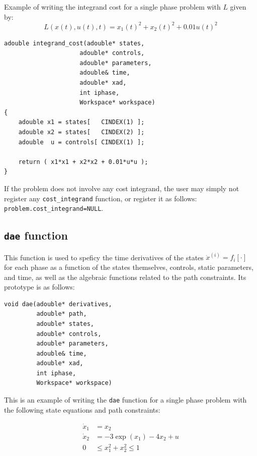 \documentclass[a4paper,11pt]{report}    %
\newenvironment{shadedframe}{%
  \def\FrameCommand{\fcolorbox{black}{shadecolor}}%
  \MakeFramed {\FrameRestore}}
{\endMakeFramed}
\begin{document}
\begin{shadedframe}
  Example of writing the integrand cost for a single phase problem with  $L$ given by:
   \begin{equation}
        L(x(t),u(t),t) = x_1(t)^2 + x_2(t)^2+0.01u(t)^2
   \end{equation}

\begin{verbatim}
adouble integrand_cost(adouble* states, 
                     adouble* controls, 
                     adouble* parameters, 
                     adouble& time, 
                     adouble* xad, 
                     int iphase,
                     Workspace* workspace)
{
    adouble x1 = states[   CINDEX(1) ];
    adouble x2 = states[   CINDEX(2) ];
    adouble  u = controls[ CINDEX(1) ];

    return ( x1*x1 + x2*x2 + 0.01*u*u );
}
\end{verbatim}


\end{shadedframe}

If the problem does not involve any cost integrand, the user may simply not register any \verb|cost_integrand| function,
or register it as follows:  \verb|problem.cost_integrand=NULL|.


\subsection{\texttt{dae} function}

This function is used to speficy the time derivatives of the states $\dot x^{(i)}=f_i[\cdot]$ for each phase as a function 
of the states themselves, controls, static parameters, and time, as well as the algebraic functions related
to the path constraints. Its prototype is as follows:

\begin{verbatim}
void dae(adouble* derivatives, 
         adouble* path, 
         adouble* states, 
         adouble* controls, 
         adouble* parameters, 
         adouble& time, 
         adouble* xad, 
         int iphase,
         Workspace* workspace)
\end{verbatim}

\begin{shadedframe}
  This is an example of writing the \texttt{dae} function for a single phase problem with the following state
equations and path constraints:

   \begin{equation}
        \begin{aligned}
            \dot x_1 &= x_2 \\
            \dot x_2 &= -3 \exp(x_1)-4 x_2 +u \\
                  0  & \le x_1^2 + x_2^2 \le 1
        \end{aligned}
   \end{equation}
\end{shadedframe}
\end{document}
